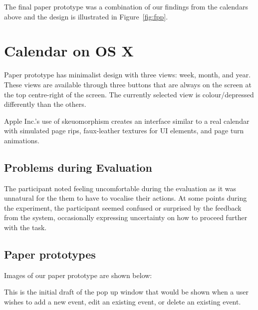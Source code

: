 \documentclass{article}
\begin{document}
The final paper prototype was a combination of our findings from the
calendars above and the design is illustrated in Figure~\ref{fig:fpp}.

\section{Calendar on OS X}

Paper prototype has minimalist design with three views: week, month,
and year. These views are available through three buttons that are
always on the screen at the top centre-right of the screen. The
currently selected view is colour/depressed differently than the
others.

Apple Inc.'s use of skeuomorphism creates an interface similar to a real 
calendar with simulated page rips, faux-leather textures for UI
elements, and page turn animations.

\subsection{Problems during Evaluation}

The participant noted feeling uncomfortable during the evaluation as it
was unnatural for the them to have to vocalise their actions. At some
points during the experiment, the participant seemed confused or
surprised by the feedback from the system, occasionally expressing
uncertainty on how to proceed further with the task.

\pagebreak

\subsection{Paper prototypes}

Images of our paper prototype are shown below:

This is the initial draft of the pop up window that would be shown when a user
wishes to add a new event, edit an existing event, or delete an existing
event.
\end{document}
